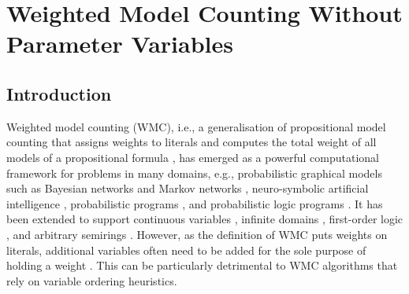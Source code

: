 \chapter{Weighted Model Counting Without Parameter Variables}

\section{Introduction}

Weighted model counting (WMC), i.e., a generalisation of propositional model
counting that assigns weights to literals and computes the total weight of all
models of a propositional formula \cite{DBLP:journals/ai/ChaviraD08}, has
emerged as a powerful computational framework for problems in many domains,
e.g., probabilistic graphical models such as Bayesian networks and Markov
networks
\cite{DBLP:conf/ecai/BartKLM16,DBLP:conf/ijcai/ChaviraD05,DBLP:conf/sat/ChaviraD06,DBLP:conf/kr/Darwiche02,DBLP:conf/aaai/SangBK05},
neuro-symbolic artificial intelligence \cite{DBLP:conf/icml/XuZFLB18},
probabilistic programs \cite{DBLP:journals/pacmpl/HoltzenBM20}, and
probabilistic logic programs \cite{DBLP:journals/tplp/FierensBRSGTJR15}. It has
been extended to support continuous variables \cite{DBLP:conf/ijcai/BellePB15},
infinite domains \cite{DBLP:conf/aaai/Belle17}, first-order logic
\cite{DBLP:journals/cacm/GogateD16,DBLP:conf/ijcai/BroeckTMDR11}, and arbitrary
semirings \cite{DBLP:journals/ijar/BelleR20,DBLP:journals/japll/KimmigBR17}.
However, as the definition of WMC puts weights on literals, additional variables
often need to be added for the sole purpose of holding a weight
\cite{DBLP:conf/ecai/BartKLM16,DBLP:conf/ijcai/ChaviraD05,DBLP:conf/sat/ChaviraD06,DBLP:conf/kr/Darwiche02,DBLP:conf/aaai/SangBK05}.
This can be particularly detrimental to WMC algorithms that rely on variable
ordering heuristics.


